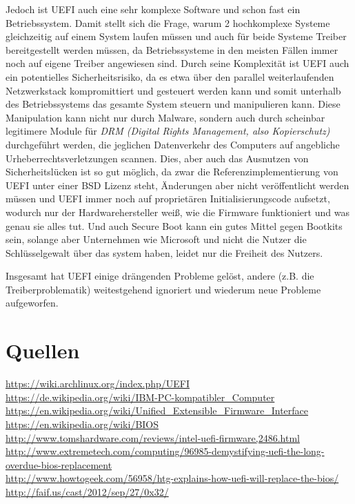 \documentclass[12pt,ngerman,twopage]{scrartcl}
\begin{document}
Jedoch ist UEFI auch eine sehr komplexe Software und schon fast ein Betriebssystem. Damit stellt sich die Frage, warum 2 hochkomplexe Systeme gleichzeitig auf einem System laufen müssen und auch für beide Systeme Treiber bereitgestellt werden müssen, da Betriebssysteme in den meisten Fällen immer noch auf eigene Treiber angewiesen sind. Durch seine Komplexität ist UEFI auch ein potentielles Sicherheitsrisiko, da es etwa über den parallel weiterlaufenden Netzwerkstack kompromittiert und gesteuert werden kann und somit unterhalb des Betriebssystems das gesamte System steuern und manipulieren kann. Diese Manipulation kann nicht nur durch Malware, sondern auch durch scheinbar legitimere Module für \textit{DRM (Digital Rights Management, also Kopierschutz)} durchgeführt werden, die jeglichen Datenverkehr des Computers auf angebliche Urheberrechtsverletzungen scannen. Dies, aber auch das Ausnutzen von Sicherheitslücken ist so gut möglich, da zwar die Referenzimplementierung von UEFI unter einer BSD Lizenz steht, Änderungen aber nicht veröffentlicht werden müssen und UEFI immer noch auf proprietären Initialisierungscode aufsetzt, wodurch nur der Hardwarehersteller weiß, wie die Firmware funktioniert und was genau sie alles tut. Und auch Secure Boot kann ein gutes Mittel gegen Bootkits sein, solange aber Unternehmen wie Microsoft und nicht die Nutzer die Schlüsselgewalt über das system haben, leidet nur die Freiheit des Nutzers.

Insgesamt hat UEFI einige drängenden Probleme gelöst, andere (z.B. die Treiberproblematik) weitestgehend ignoriert und wiederum neue Probleme aufgeworfen.

\onecolumn
\section{Quellen}
\url{https://wiki.archlinux.org/index.php/UEFI}\\
\url{https://de.wikipedia.org/wiki/IBM-PC-kompatibler_Computer}\\
\url{https://en.wikipedia.org/wiki/Unified_Extensible_Firmware_Interface}\\
\url{https://en.wikipedia.org/wiki/BIOS}\\
\url{http://www.tomshardware.com/reviews/intel-uefi-firmware,2486.html}\\
\url{http://www.extremetech.com/computing/96985-demystifying-uefi-the-long-overdue-bios-replacement}\\
\url{http://www.howtogeek.com/56958/htg-explains-how-uefi-will-replace-the-bios/}\\
\url{http://faif.us/cast/2012/sep/27/0x32/}\\
\end{document}
